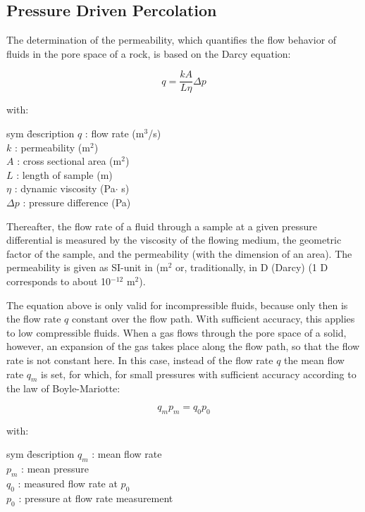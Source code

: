 \subsection{Pressure Driven Percolation}
The determination of the permeability, which quantifies the flow behavior of fluids in the pore space of a rock, is based on the Darcy equation:

\begin{equation}
q = \frac{kA}{L\eta}\Delta p
\end{equation}

with:
\begin{tabbing}
sym \= description \kill
$q$ : \> flow rate (m$^3$/s) \\
$k$ : \> permeability (m$^2$) \\
$A$ : \> cross sectional area (m$^2$) \\
$L$ : \> length of sample (m) \\
$\eta$ : \> dynamic viscosity (Pa$\cdot$ s) \\
$\Delta p$ : \> pressure difference (Pa)
\end{tabbing}

Thereafter, the flow rate of a fluid through a sample at a given pressure differential is measured by the viscosity of the flowing medium, the geometric factor of the sample, and the permeability (with the dimension of an area). The permeability is given as SI-unit in (m$^2$ or, traditionally, in D (Darcy) (1 D corresponds to about 10$^{-12}$ m$^2$).

The equation above is only valid for incompressible fluids, because only then is the flow rate $q$ constant over the flow path. With sufficient accuracy, this applies to low compressible fluids.
When a gas flows through the pore space of a solid, however, an expansion of the gas takes place along the flow path, so that the flow rate is not constant here. In this case, instead of the flow rate $q$ the mean flow rate $q_m$ is set, for which, for small pressures with sufficient accuracy according to the law of Boyle-Mariotte:

\begin{equation}
q_m p_m = q_0 p_0
\end{equation}

with:
\begin{tabbing}
sym \= description \kill
$q_m$ : \> mean flow rate \\
$p_m$ : \> mean pressure \\
$q_0$ : \> measured flow rate at $p_0$ \\
$p_0$ : \> pressure at flow rate measurement 
\end{tabbing}

